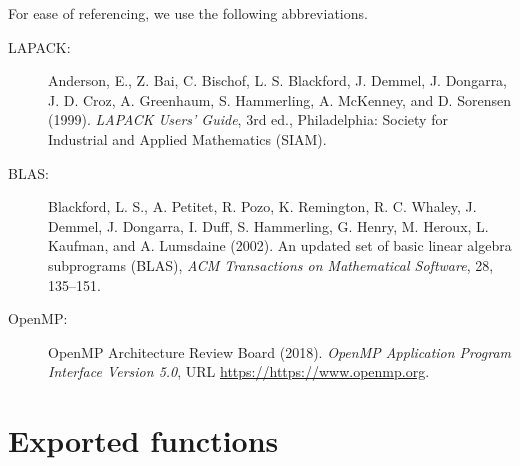 \documentclass[a4paper,oneside,10pt,DIV=12]{scrartcl}
\begin{document}
For ease of referencing, we use the following abbreviations.
\begin{description}
	\item[\small{LAPACK}:] Anderson, E., Z. Bai, C. Bischof, L. S. Blackford,
J. Demmel, J. Dongarra, J. D. Croz, A. Greenhaum, S. Hammerling, A. McKenney,
and D. Sorensen (1999). \textit{LAPACK Users’ Guide}, 3rd ed., Philadelphia:
Society for Industrial and Applied Mathematics (SIAM).
	\item[\small{BLAS}:] Blackford, L. S., A. Petitet, R. Pozo, K. Remington,
R. C. Whaley, J. Demmel, J. Dongarra, I. Duff, S. Hammerling, G. Henry,
M. Heroux, L. Kaufman, and A. Lumsdaine (2002). An updated set of basic linear
algebra subprograms (BLAS), \textit{ACM Transactions on Mathematical Software},
28, 135--151.
    \item[\small{OpenMP}:] OpenMP Architecture Review Board (2018).
        \emph{OpenMP Application Program Interface Version 5.0}, URL
        \href{https://https://www.openmp.org}{https://https://www.openmp.org}.
\end{description}



\section{Exported functions}
\end{document}
